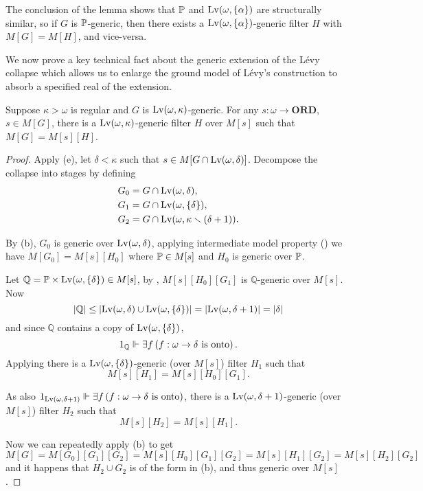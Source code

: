 \begin{corollary}
    The conclusion of the lemma shows that \(\P\) and \(\Lv(\omega,\set{\alpha})\) are structurally similar,
    so if \(G\) is \(\P\)-generic, then there exists a \(\Lv(\omega,\set{\alpha})\)-generic filter \(H\) with \(M[G] = M[H]\),
    and vice-versa.
\end{corollary}


\newcommand*{\Q}{{\mathbb{Q}}}
We now prove a key technical fact about the generic extension of the Lévy collapse
which allows us to enlarge the ground model of Lévy's construction to absorb a specified real of the extension.
\begin{lemma} \label{lemma:important}
    Suppose \(\kappa>\omega\) is regular and \(G\) is \(\Lv(\omega,\kappa)\)-generic.
    For any \(s:\omega\to\mathbf{ORD}\), \(s\in M[G]\),
    there is a \(\Lv(\omega,\kappa)\)-generic filter \(H\) over \(M[s]\)
    such that \(M[G] = M[s][H]\).
\end{lemma}
\begin{proof}
    Apply  (e), let \(\delta<\kappa\) such that \(s \in M[G\cap\Lv(\omega,\delta)]\).
    Decompose the collapse into stages by defining
    \begin{align*}
        G_0 &= G\cap\Lv(\omega,\delta), \\
        G_1 &= G\cap\Lv(\omega,\set{\delta}), \\
        G_2 &= G\cap\Lv(\omega,\kappa\setminus(\delta+1)).
    \end{align*}

    By  (b), \(G_0\) is generic over \(\Lv(\omega,\delta)\),
    applying intermediate model property ()
    we have \(M[G_0] = M[s][H_0]\) where \(\P\in M[s]\) and \(H_0\) is generic over \(\P\).

    Let \(\Q = \P\times\Lv(\omega,\set{\delta}) \in M[s]\),
    by , \(M[s][H_0][G_1]\) is \(\Q\)-generic over \(M[s]\).
    Now
    \[ \abs{\Q} \leq \abs{\Lv(\omega,\delta)\cup\Lv(\omega,\set{\delta})} = \abs{\Lv(\omega,\delta+1)} = \abs{\delta} \]
    and since \(\Q\) contains a copy of \(\Lv(\omega,\set{\delta})\),
    \[ 1_\Q \forces \exists f\paren{f:\omega\to\delta \text{ is onto}}. \]
    Applying 
    there is a \(\Lv(\omega,\set{\delta})\)-generic (over \(M[s]\)) filter \(H_1\) such that \[ M[s][H_1] = M[s][H_0][G_1].\]

    As also \( 1_{\Lv(\omega,\delta+1)} \forces \exists f\paren{f:\omega\to\delta \text{ is onto}} \),
    there is a \(\Lv(\omega,\delta+1)\)-generic (over \(M[s]\)) filter \(H_2\) such that \[ M[s][H_2] = M[s][H_1]. \]

    Now we can repeatedly apply  (b) to get
    \[ M[G] = M[G_0][G_1][G_2] = M[s][H_0][G_1][G_2] = M[s][H_1][G_2] = M[s][H_2][G_2] \]
    and it happens that \(H_2 \cup G_2\) is of the form in  (b), and thus generic over \(M[s]\).
\end{proof}




